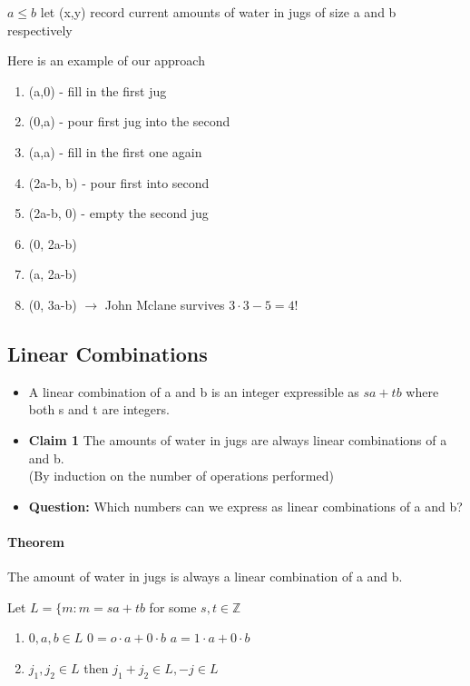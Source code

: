 \documentclass[9pt, letterpaper, oneside]{article}
\begin{document}
$a \leq b$ let (x,y) record current amounts of water in jugs of size a and b respectively

Here is an example of our approach
\begin{enumerate}
    \item (a,0) - fill in the first jug
    \item (0,a) - pour first jug into the second
    \item (a,a) - fill in the first one again
    \item (2a-b, b) - pour first into second
    \item (2a-b, 0) - empty the second jug
    \item (0, 2a-b)
    \item (a, 2a-b)
    \item (0, 3a-b) $\to$ John Mclane survives $3 \cdot 3 - 5 = 4!$
\end{enumerate}

\subsection{Linear Combinations}
\begin{itemize}
    \item A linear combination of a and b is an integer expressible as $sa + tb$ where both s and t are integers.
    \item \textbf{Claim 1} The amounts of water in jugs are always linear combinations of a and b.\\
    (By induction on the number of operations performed)\\
    \item \textbf{Question:} Which numbers can we express as linear combinations of a and b?
\end{itemize}




\paragraph{Theorem} The amount of water in jugs is always a linear combination of a and b.

Let $L = \{m : m = sa+tb$ for some $s, t \in \mathbb{Z}$

\begin{enumerate}
    \item $0, a, b \in L$
		$0 = o \cdot a + 0 \cdot b$
		$a = 1 \cdot a + 0 \cdot b$
	\item $j_1, j_2 \in L$ then $j_1 + j_2 \in L, -j \in L$\\
\end{enumerate}
\end{document}
